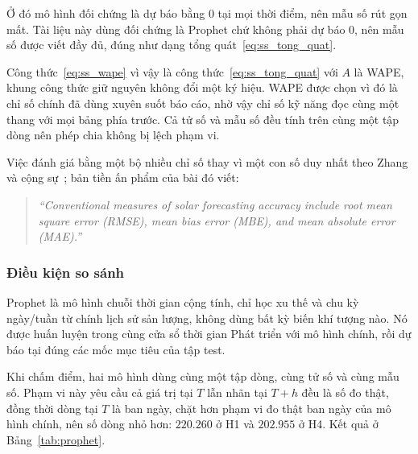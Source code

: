 Ở đó mô hình đối chứng là dự báo bằng $0$ tại mọi thời điểm, nên mẫu số rút gọn mất. Tài liệu này
dùng đối chứng là Prophet chứ không phải dự báo $0$, nên mẫu số được viết đầy đủ, đúng như dạng
tổng quát~\eqref{eq:ss_tong_quat}.

Công thức~\eqref{eq:ss_wape} vì vậy là công thức~\eqref{eq:ss_tong_quat} với $A$ là WAPE, khung
công thức giữ nguyên không đổi một ký hiệu. WAPE được chọn vì đó là chỉ số chính đã dùng xuyên
suốt báo cáo, nhờ vậy chỉ số kỹ năng đọc cùng một thang với mọi bảng phía trước. Cả tử số và mẫu
số đều tính trên cùng một tập dòng nên phép chia không bị lệch phạm vi.

Việc đánh giá bằng một bộ nhiều chỉ số thay vì một con số duy nhất theo Zhang và cộng
sự~\cite{zhang2015metrics}; bản tiền ấn phẩm của bài đó viết:

\begin{quote}\small
\textit{``Conventional measures of solar forecasting accuracy include root mean square error
(RMSE), mean bias error (MBE), and mean absolute error (MAE).''}
\end{quote}


\subsubsection{Điều kiện so sánh}

Prophet là mô hình chuỗi thời gian cộng tính, chỉ học xu thế và chu kỳ ngày/tuần từ chính lịch
sử sản lượng, không dùng bất kỳ biến khí tượng nào. Nó được huấn luyện trong cùng cửa
sổ thời gian Phát triển với mô hình chính, rồi dự báo tại đúng các mốc mục tiêu của tập test.

Khi chấm điểm, hai mô hình dùng cùng một tập dòng, cùng tử số và cùng mẫu số. Phạm vi
này yêu cầu cả giá trị tại $T$ lẫn nhãn tại $T{+}h$ đều là số đo thật, đồng thời dòng tại $T$
là ban ngày, chặt hơn phạm vi đo thật ban ngày của mô hình chính, nên số dòng nhỏ hơn:
$220.260$ ở H1 và $202.955$ ở H4. Kết quả ở Bảng~\ref{tab:prophet}.

